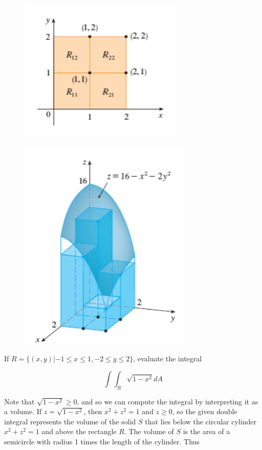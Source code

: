         \begin{figure}[hbt!]
            \centering
            \includegraphics[scale = 0.75]{Resources/15.1_Squares}
        \end{figure}

        \begin{figure}[hbt!]
            \centering
            \includegraphics[scale = 0.75]{Resources/15.1_Example_Volume}
        \end{figure}

        \textit{} If $R = \{(x,y) | -1 \leq x \leq 1, -2 \leq y \leq 2\}$, evaluate the integral

        \[
            \int \int_R \sqrt{1-x^2} dA
        \]

        Note that $\sqrt{1-x^2}\geq 0$, and so we can compute the integral by interpreting it as a volume. If $z=\sqrt{1- x^2}$, then $x^2 + z^2 = 1$ and $z \geq 0$, so the given double integral represents the volume of
        the solid $S$ that lies below the circular cylinder $x^2 + z^2 = 1$ and above the rectangle $R$. The volume of $S$ is the area of a semicircle with radius 1 times the length of the cylinder. Thus

